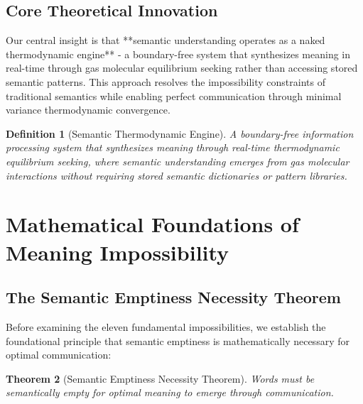 \documentclass[11pt,a4paper]{article}
\newtheorem{theorem}{Theorem}[section]
\newtheorem{definition}[theorem]{Definition}
\begin{document}
\subsection{Core Theoretical Innovation}

Our central insight is that **semantic understanding operates as a naked thermodynamic engine** - a boundary-free system that synthesizes meaning in real-time through gas molecular equilibrium seeking rather than accessing stored semantic patterns. This approach resolves the impossibility constraints of traditional semantics while enabling perfect communication through minimal variance thermodynamic convergence.

\begin{definition}[Semantic Thermodynamic Engine]
A boundary-free information processing system that synthesizes meaning through real-time thermodynamic equilibrium seeking, where semantic understanding emerges from gas molecular interactions without requiring stored semantic dictionaries or pattern libraries.
\end{definition}

\section{Mathematical Foundations of Meaning Impossibility}

\subsection{The Semantic Emptiness Necessity Theorem}

Before examining the eleven fundamental impossibilities, we establish the foundational principle that semantic emptiness is mathematically necessary for optimal communication:

\begin{theorem}[Semantic Emptiness Necessity Theorem]
Words must be semantically empty for optimal meaning to emerge through communication.
\end{theorem}
\end{document}
